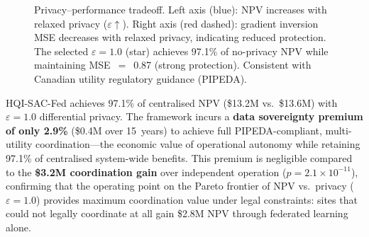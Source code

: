 \documentclass[journal]{IEEEtran}
\begin{document}
\begin{figure}[t]
\centering
{}
\caption{Privacy--performance tradeoff. Left axis (blue): NPV increases
with relaxed privacy ($\varepsilon \uparrow$). Right axis (red dashed):
gradient inversion MSE decreases with relaxed privacy, indicating
reduced protection. The selected $\varepsilon = 1.0$ (star) achieves
97.1\% of no-privacy NPV while maintaining MSE~$=$~0.87 (strong
protection). Consistent with Canadian utility regulatory guidance
(PIPEDA).}
\label{fig:privacy}
\end{figure}

HQI-SAC-Fed achieves 97.1\% of centralised NPV (\$13.2M
vs.\ \$13.6M) with $\varepsilon{=}1.0$ differential privacy. The
framework incurs a \textbf{data sovereignty premium of only 2.9\%}
(\$0.4M over 15~years) to achieve full PIPEDA-compliant,
multi-utility coordination---the economic value of operational autonomy
while retaining 97.1\% of centralised system-wide benefits. This
premium is negligible compared to the \textbf{\$3.2M coordination gain}
over independent operation ($p = 2.1 \times 10^{-11}$), confirming
that the operating point on the Pareto frontier of NPV vs.\ privacy
($\varepsilon{=}1.0$) provides maximum coordination value under legal
constraints: sites that could not legally coordinate at all gain
\$2.8M NPV through federated learning alone.
\end{document}
